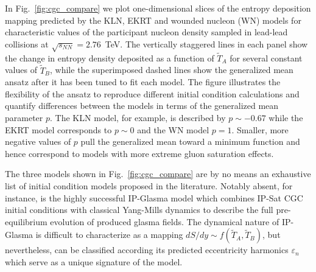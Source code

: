 \documentclass[aps,prc,reprint,amsmath,nofootinbib]{revtex4-1}
\newcommand{\sqrts}{\sqrt{s_{NN}}}
\newcommand{\T}{\tilde{T}}
\begin{document}
In Fig.~\ref{fig:cgc_compare} we plot one-dimensional slices of the entropy deposition mapping predicted by the KLN, EKRT and wounded nucleon (WN) models for characteristic values of the participant nucleon density sampled in lead-lead collisions at $\sqrts=2.76$~TeV. The vertically staggered lines in each panel show the change in entropy density deposited as a function of $\T_A$ for several constant values of $\T_B$, while the superimposed dashed lines show the generalized mean ansatz after it has been tuned to fit each model. The figure illustrates the flexibility of the ansatz to reproduce different initial condition calculations and quantify differences between the models in terms of the generalized mean parameter $p$. The KLN model, for example, is described by $p\sim-0.67$ while the EKRT model corresponds to $p \sim 0$ and the WN model $p=1$. Smaller, more negative values of $p$ pull the generalized mean toward a minimum function and hence correspond to models with more extreme gluon saturation effects.

The three models shown in Fig.~\ref{fig:cgc_compare} are by no means an exhaustive list of initial condition models proposed in the literature. Notably absent, for instance, is the highly successful IP-Glasma model which combines IP-Sat CGC initial conditions with classical Yang-Mills dynamics to describe the full pre-equilibrium evolution of produced glasma fields. The dynamical nature of IP-Glasma is difficult to characterize as a mapping ${dS/dy \sim f(\T_A,\T_B)}$, but nevertheless, can be classified according its predicted eccentricity harmonics $\varepsilon_n$ which serve as a unique signature of the model.
\end{document}
